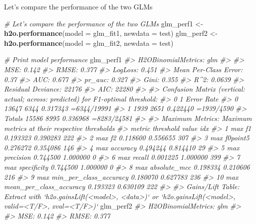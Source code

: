 \documentclass[]{book}
\newenvironment{Shaded}{\begin{snugshade}}{\end{snugshade}}
\newcommand{\CommentTok}[1]{\textcolor[rgb]{0.56,0.35,0.01}{\textit{#1}}}
\newcommand{\DataTypeTok}[1]{\textcolor[rgb]{0.13,0.29,0.53}{#1}}
\newcommand{\KeywordTok}[1]{\textcolor[rgb]{0.13,0.29,0.53}{\textbf{#1}}}
\newcommand{\NormalTok}[1]{#1}
\newcommand{\StringTok}[1]{\textcolor[rgb]{0.31,0.60,0.02}{#1}}
\begin{document}
Let's compare the performance of the two GLMs

\begin{Shaded}
\begin{Highlighting}[]
\CommentTok{# Let's compare the performance of the two GLMs}
\NormalTok{glm_perf1 <-}\StringTok{ }\KeywordTok{h2o.performance}\NormalTok{(}\DataTypeTok{model =}\NormalTok{ glm_fit1,}
                             \DataTypeTok{newdata =}\NormalTok{ test)}
\NormalTok{glm_perf2 <-}\StringTok{ }\KeywordTok{h2o.performance}\NormalTok{(}\DataTypeTok{model =}\NormalTok{ glm_fit2,}
                             \DataTypeTok{newdata =}\NormalTok{ test)}

\CommentTok{# Print model performance}
\NormalTok{glm_perf1}
\CommentTok{#> H2OBinomialMetrics: glm}
\CommentTok{#> }
\CommentTok{#> MSE:  0.142}
\CommentTok{#> RMSE:  0.377}
\CommentTok{#> LogLoss:  0.451}
\CommentTok{#> Mean Per-Class Error:  0.37}
\CommentTok{#> AUC:  0.677}
\CommentTok{#> pr_auc:  0.327}
\CommentTok{#> Gini:  0.355}
\CommentTok{#> R^2:  0.0639}
\CommentTok{#> Residual Deviance:  22176}
\CommentTok{#> AIC:  22280}
\CommentTok{#> }
\CommentTok{#> Confusion Matrix (vertical: actual; across: predicted) for F1-optimal threshold:}
\CommentTok{#>            0    1    Error         Rate}
\CommentTok{#> 0      13647 6344 0.317343  =6344/19991}
\CommentTok{#> 1       1939 2651 0.422440   =1939/4590}
\CommentTok{#> Totals 15586 8995 0.336968  =8283/24581}
\CommentTok{#> }
\CommentTok{#> Maximum Metrics: Maximum metrics at their respective thresholds}
\CommentTok{#>                         metric threshold    value idx}
\CommentTok{#> 1                       max f1  0.193323 0.390283 222}
\CommentTok{#> 2                       max f2  0.118600 0.556655 307}
\CommentTok{#> 3                 max f0point5  0.276272 0.354086 146}
\CommentTok{#> 4                 max accuracy  0.494244 0.814410  29}
\CommentTok{#> 5                max precision  0.744500 1.000000   0}
\CommentTok{#> 6                   max recall  0.001225 1.000000 399}
\CommentTok{#> 7              max specificity  0.744500 1.000000   0}
\CommentTok{#> 8             max absolute_mcc  0.198334 0.210606 216}
\CommentTok{#> 9   max min_per_class_accuracy  0.180070 0.627783 236}
\CommentTok{#> 10 max mean_per_class_accuracy  0.193323 0.630109 222}
\CommentTok{#> }
\CommentTok{#> Gains/Lift Table: Extract with `h2o.gainsLift(<model>, <data>)` or `h2o.gainsLift(<model>, valid=<T/F>, xval=<T/F>)`}
\NormalTok{glm_perf2}
\CommentTok{#> H2OBinomialMetrics: glm}
\CommentTok{#> }
\CommentTok{#> MSE:  0.142}
\CommentTok{#> RMSE:  0.377}

\end{Highlighting}
\end{Shaded}
\end{document}
